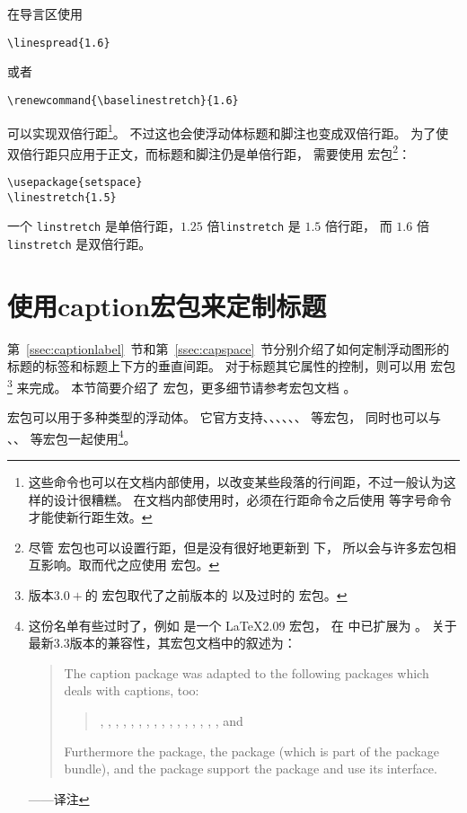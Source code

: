 在导言区使用
\begin{lstlisting}
\linespread{1.6}
\end{lstlisting}
或者
\begin{lstlisting}
\renewcommand{\baselinestretch}{1.6}
\end{lstlisting}
可以实现双倍行距\footnote{
	这些命令也可以在文档内部使用，以改变某些段落的行间距，不过一般认为这样的设计很糟糕。
	在文档内部使用时，必须在行距命令之后使用  等字号命令才能使新行距生效。}。
不过这也会使浮动体标题和脚注也变成双倍行距。
为了使双倍行距只应用于正文，而标题和脚注仍是单倍行距，
需要使用  宏包\footnote{
	尽管  宏包也可以设置行距，但是没有很好地更新到 \LaTeXe{} 下，
	所以会与许多宏包相互影响。取而代之应使用  宏包。}：
\begin{lstlisting}
\usepackage{setspace}
\linestretch{1.5}
\end{lstlisting}
一个 \texttt{linstretch} 是单倍行距，$1.25$ 倍\texttt{linstretch} 是 $1.5$ 倍行距，
而 $1.6$ 倍 \texttt{linstretch} 是双倍行距。


\section{使用caption宏包来定制标题}\label{sec:caption-pkg}

第~\ref{ssec:captionlabel}~节和第~\ref{ssec:capspace}~节分别介绍了如何定制浮动图形的标题的标签和标题上下方的垂直间距。
对于标题其它属性的控制，则可以用  宏包\footnote{
	版本$3.0+$的  宏包取代了之前版本的  以及过时的  宏包。}
来完成。
本节简要介绍了  宏包，更多细节请参考宏包文档 \cite{caption-doc}。

 宏包可以用于多种类型的浮动体。
它官方支持、、、、、、 等宏包，
同时也可以与 、、 等宏包一起使用\footnote{
	这份名单有些过时了，例如  是一个 \LaTeX2.09 宏包，
	在 \LaTeXe{} 中已扩展为 。
	关于最新3.3版本的兼容性，其宏包文档\cite{caption-doc}中的叙述为：
	\begin{quotation}
		The caption package was adapted to the following packages which deals with captions, too:
		
		\begin{quote}
			, , , , , , , , , , , , , , , , and 
		\end{quote}
		
		Furthermore the  package, the  package (which is part of the  package bundle), and the  package support the  package and use its  interface.
	\end{quotation}
	——译注}。

